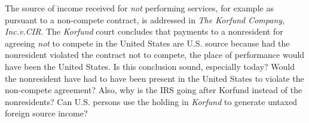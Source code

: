 %
%
%

The source of income received for \emph{not} performing services, for example as pursuant to a non-compete contract, is addressed in \emph{The Korfund Company, Inc.\@ v.\@ CIR}.  The \emph{Korfund} court concludes that payments to a nonresident for agreeing \emph{not} to compete in the United States are U.S. source because had the nonresident violated the contract not to compete, the place of performance would have been the United States.  Is this conclusion sound, especially today?  Would the nonresident have had to have been present in the United States to violate the non-compete agreement?  Also, why is the IRS going after Korfund instead of the nonresidents?  Can U.S. persons use the holding in \emph{Korfund} to generate untaxed foreign source income?

